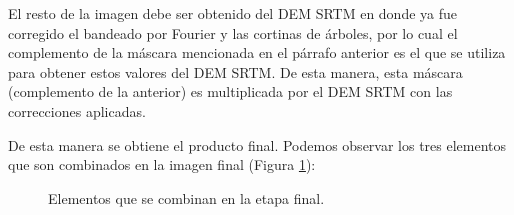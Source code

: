 \documentclass[10pt,a4paper, twoside]{report}
\begin{document}
El resto de la imagen debe ser obtenido del DEM SRTM en donde ya fue corregido el bandeado por Fourier y las cortinas de árboles, por lo cual el complemento de la máscara mencionada en el párrafo anterior es el que se utiliza para obtener estos valores del DEM SRTM. De esta manera, esta máscara (complemento de la anterior) es multiplicada por el DEM SRTM con las correcciones aplicadas.

De esta manera se obtiene el producto final. Podemos observar los tres elementos que son combinados en la imagen final (Figura \ref{elementosACombinar}):

\begin{figure}[H]
	\centering
	\caption{Elementos que se combinan en la etapa final.}
	\label{elementosACombinar}
\end{figure}
\end{document}
